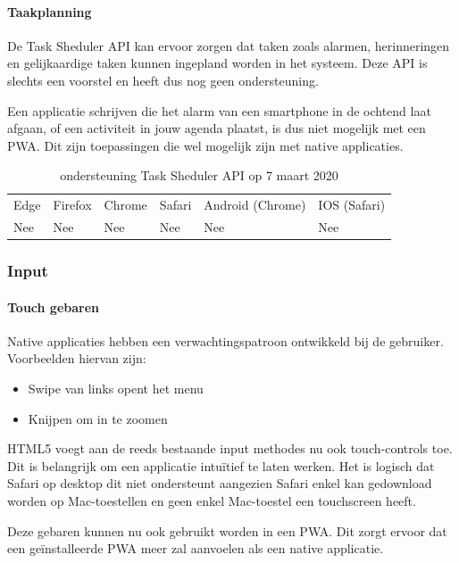 \paragraph{Taakplanning}
De Task Sheduler API \autocite{Kulkarni2015} kan ervoor zorgen dat taken zoals alarmen, herinneringen en gelijkaardige taken kunnen ingepland worden in het systeem. Deze API is slechts een voorstel en heeft dus nog geen ondersteuning.

Een applicatie schrijven die het alarm van een smartphone in de ochtend laat afgaan, of een activiteit in jouw agenda plaatst, is dus niet mogelijk met een PWA. Dit zijn toepassingen die wel mogelijk zijn met native applicaties.

\begin{table}[H]
	\centering
	\begin{tabular}{llllll}
		Edge & Firefox & Chrome & Safari & Android (Chrome) & IOS (Safari) \\
		Nee   & Nee      &  Nee     & Nee     & Nee               & Nee          
	\end{tabular}	
	\caption{ondersteuning Task Sheduler API op 7 maart 2020}
\end{table}	



\subsubsection{Input}

\paragraph{Touch gebaren}

Native applicaties hebben een verwachtingspatroon ontwikkeld bij de gebruiker. Voorbeelden hiervan zijn:

 \begin{itemize}
	\item	Swipe van links opent het menu
	\item	Knijpen om in te zoomen
\end{itemize}

HTML5 voegt aan de reeds bestaande input methodes nu ook touch-controls toe. Dit is belangrijk om een applicatie intuïtief te laten werken. Het is logisch dat Safari op desktop dit niet ondersteunt aangezien Safari enkel kan gedownload worden op Mac-toestellen en geen enkel Mac-toestel een touchscreen heeft.

Deze gebaren kunnen nu ook gebruikt worden in een PWA. Dit zorgt ervoor dat een geïnstalleerde PWA meer zal aanvoelen als een native applicatie.


